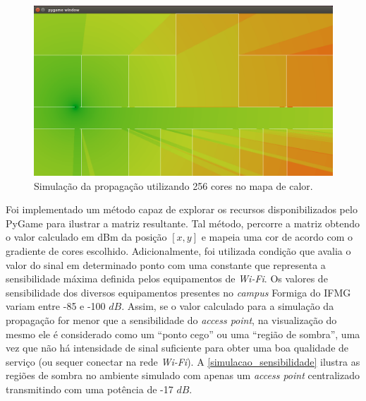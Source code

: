 \documentclass[
	12pt,				%
	twoside,			%
	a4paper,			%
	english,			%
	french,				%
	spanish,			%
	brazil				%
	]{abntex2}
\begin{document}
\begin{figure}[ht]
    \caption{\label{represetacao_simulacao} Simulação da propagação utilizando 256 cores no mapa de calor.}
    \begin{center}
        \includegraphics[scale=0.4]{imagens/representacao-simulacao.jpg}
    \end{center}
\end{figure}

Foi implementado um método capaz de explorar os recursos
disponibilizados pelo PyGame para ilustrar a matriz resultante. Tal
método, percorre a matriz obtendo o valor calculado em dBm da posição
\([x, y]\) e mapeia uma cor de acordo com o gradiente de cores
escolhido. Adicionalmente, foi utilizada condição que avalia o valor do
sinal em determinado ponto com uma constante que representa a
sensibilidade máxima definida pelos equipamentos de \emph{Wi-Fi}. Os
valores de sensibilidade dos diversos equipamentos presentes no
\emph{campus} Formiga do IFMG variam entre -85 e -100 \(dB\). Assim, se
o valor calculado para a simulação da propagação for menor que a
sensibilidade do \emph{access point}, na visualização do mesmo ele é
considerado como um ``ponto cego'' ou uma ``região de sombra'', uma vez
que não há intensidade de sinal suficiente para obter uma boa qualidade
de serviço (ou sequer conectar na rede \emph{Wi-Fi}). A
\autoref{simulacao_sensibilidade} ilustra as regiões de sombra no
ambiente simulado com apenas um \emph{access point} centralizado
transmitindo com uma potência de -17 \(dB\).
\end{document}
